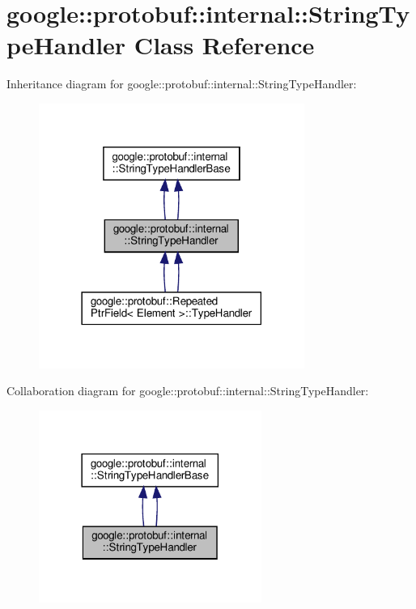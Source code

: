 \hypertarget{classgoogle_1_1protobuf_1_1internal_1_1StringTypeHandler}{}\section{google\+:\+:protobuf\+:\+:internal\+:\+:String\+Type\+Handler Class Reference}
\label{classgoogle_1_1protobuf_1_1internal_1_1StringTypeHandler}


Inheritance diagram for google\+:\+:protobuf\+:\+:internal\+:\+:String\+Type\+Handler\+:
\nopagebreak
\begin{figure}[H]
\begin{center}
\leavevmode
\includegraphics[width=246pt]{classgoogle_1_1protobuf_1_1internal_1_1StringTypeHandler__inherit__graph}
\end{center}
\end{figure}


Collaboration diagram for google\+:\+:protobuf\+:\+:internal\+:\+:String\+Type\+Handler\+:
\nopagebreak
\begin{figure}[H]
\begin{center}
\leavevmode
\includegraphics[width=206pt]{classgoogle_1_1protobuf_1_1internal_1_1StringTypeHandler__coll__graph}
\end{center}
\end{figure}
